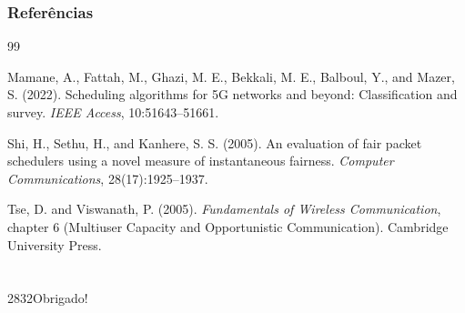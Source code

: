 \documentclass[noamsthm,notheorems,11pt,compress,fontset=windows]{beamer}
\makeatletter
\numberwithin{figure}{section}
\numberwithin{table}{section}
\numberwithin{equation}{section}
\theoremstyle{plain} %
\newcommand\HUGE{\@setfontsize\Huge{28}{32}}
\makeatother
\begin{document}
\begin{frame}
\frametitle{Referências}
\small
\begin{thebibliography}{99}

Mamane, A., Fattah, M., Ghazi, M. E., Bekkali, M. E., Balboul, Y., and Mazer, S. (2022).
Scheduling algorithms for 5G networks and beyond: Classification and survey.
\emph{IEEE Access}, 10:51643–51661.

Shi, H., Sethu, H., and Kanhere, S. S. (2005).
An evaluation of fair packet schedulers using a novel measure of instantaneous fairness.
\emph{Computer Communications}, 28(17):1925–1937.

Tse, D. and Viswanath, P. (2005).
\emph{Fundamentals of Wireless Communication},
chapter 6 (Multiuser Capacity and Opportunistic Communication).
Cambridge University Press.

\end{thebibliography}
\end{frame}


\section{}


\begin{frame}
\begin{center}
\HUGE \textcolor[RGB]{0,0,0}{Obrigado!}
\end{center}
\end{frame}
\end{document}
